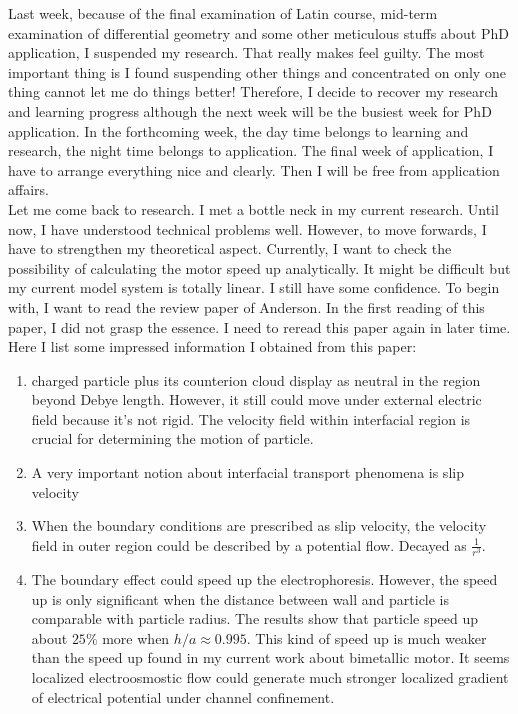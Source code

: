 \documentclass[fontsize=11pt, %
                             paper=a4, %
                             twoside, %
                             captions=tableheading,
                             index=totoc,
                             hyperref]{labbook}
\begin{document}
\begin{addmargin}[4cm]{0cm}
Last week, because of the final examination of Latin course, mid-term examination of differential geometry and some other meticulous stuffs about PhD application, I suspended my research. That really makes feel guilty. The most important thing is I found suspending other things and concentrated on only one thing cannot let me do things better! Therefore, I decide to recover my research and learning progress although the next week will be the busiest week for PhD application. In the forthcoming week, the day time belongs to learning and research, the night time belongs to application. The final week of application, I have to arrange everything nice and clearly. Then I will be free from application affairs. \\
Let me come back to research. I met a bottle neck in my current research. Until now, I have understood technical problems well. However, to move forwards, I have to strengthen my theoretical aspect. Currently, I want to check the possibility of calculating the motor speed up analytically. It might be difficult but my current model system is totally linear. I still have some confidence. To begin with, I want to read the review paper of Anderson\cite{Anderson1989}.
In the first reading of this paper, I did not grasp the essence. I need to reread this paper again in later time. Here I list some impressed information I obtained from this paper:
\begin{enumerate}
\item
charged particle plus its counterion cloud display as neutral in the region beyond Debye length. However, it still could move under external electric field because it's not rigid. The velocity field within interfacial region is crucial for determining the motion of particle. 
\item
A very important notion about interfacial transport phenomena is slip velocity
\item
When the boundary conditions are prescribed as slip velocity, the velocity field in outer region could be described by a potential flow. Decayed as $\frac{1}{r^3}$. 
\item
The boundary effect could speed up the electrophoresis. However, the speed up is only significant when the distance between wall and particle is comparable with particle radius. The results show that particle speed up about $25\%$ more when $h/a \approx 0.995$. This kind of speed up is much weaker than the speed up found in my current work about bimetallic motor. It seems localized electroosmostic flow could generate much stronger localized gradient of electrical potential under channel confinement.

\end{enumerate}
\end{addmargin}
\end{document}
